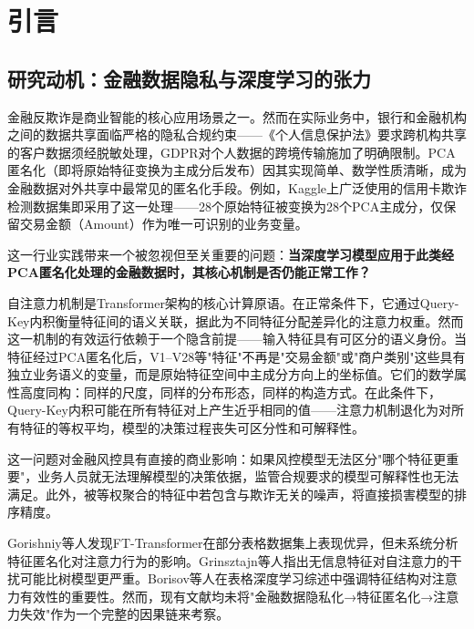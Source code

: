 
\section{引言}
\label{sec:introduction}

\subsection{研究动机：金融数据隐私与深度学习的张力}

金融反欺诈是商业智能的核心应用场景之一。然而在实际业务中，银行和金融机构之间的数据共享面临严格的隐私合规约束——《个人信息保护法》要求跨机构共享的客户数据须经脱敏处理，GDPR对个人数据的跨境传输施加了明确限制。PCA匿名化（即将原始特征变换为主成分后发布）因其实现简单、数学性质清晰，成为金融数据对外共享中最常见的匿名化手段。例如，Kaggle上广泛使用的信用卡欺诈检测数据集即采用了这一处理——28个原始特征被变换为28个PCA主成分，仅保留交易金额（Amount）作为唯一可识别的业务变量。

这一行业实践带来一个被忽视但至关重要的问题：\textbf{当深度学习模型应用于此类经PCA匿名化处理的金融数据时，其核心机制是否仍能正常工作？}

自注意力机制\cite{vaswani2017attention}是Transformer架构\cite{dosovitskiy2020image}的核心计算原语。在正常条件下，它通过Query-Key内积衡量特征间的语义关联，据此为不同特征分配差异化的注意力权重。然而这一机制的有效运行依赖于一个隐含前提——输入特征具有可区分的语义身份。当特征经过PCA匿名化后，V1--V28等"特征"不再是"交易金额"或"商户类别"这些具有独立业务语义的变量，而是原始特征空间中主成分方向上的坐标值。它们的数学属性高度同构：同样的尺度，同样的分布形态，同样的构造方式。在此条件下，Query-Key内积可能在所有特征对上产生近乎相同的值——注意力机制退化为对所有特征的等权平均，模型的决策过程丧失可区分性和可解释性。

这一问题对金融风控具有直接的商业影响：如果风控模型无法区分"哪个特征更重要"，业务人员就无法理解模型的决策依据，监管合规要求的模型可解释性也无法满足。此外，被等权聚合的特征中若包含与欺诈无关的噪声，将直接损害模型的排序精度。

Gorishniy等人\cite{gorishniy2021revisiting}发现FT-Transformer在部分表格数据集上表现优异，但未系统分析特征匿名化对注意力行为的影响。Grinsztajn等人\cite{grinsztajn2022tree}指出无信息特征对自注意力的干扰可能比树模型更严重。Borisov等人\cite{borisov2024deep}在表格深度学习综述中强调特征结构对注意力有效性的重要性。然而，现有文献均未将"金融数据隐私化→特征匿名化→注意力失效"作为一个完整的因果链来考察。

